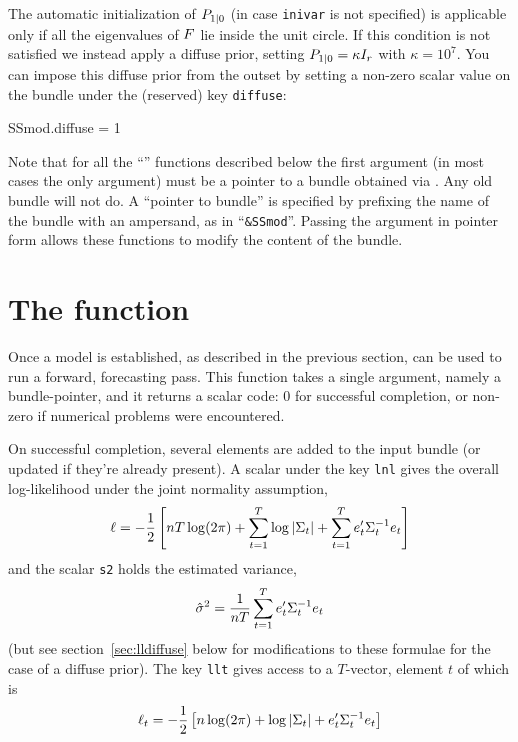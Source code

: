 \documentclass[a4paper]{article}
\begin{document}
The automatic initialization of $P_{1|0}$ (in case
\texttt{inivar} is not specified) is applicable only if all the
eigenvalues of $F$ lie inside the unit circle.  If this
condition is not satisfied we instead apply a diffuse prior, setting
$P_{1|0} = \kappa I_r$ with $\kappa = 10^7$.  You can
impose this diffuse prior from the outset by setting a non-zero scalar
value on the bundle under the (reserved) key \texttt{diffuse}:
%
\begin{code}
SSmod.diffuse = 1
\end{code}

Note that for all the ``'' functions described below the
first argument (in most cases the only argument) must be a pointer to
a bundle obtained via . Any old bundle will not do. A
``pointer to bundle'' is specified by prefixing the name of the bundle
with an ampersand, as in ``\verb|&SSmod|''. Passing the argument in
pointer form allows these functions to modify the content of the
bundle. 

\section{The  function}
\label{sec:kfilter}

Once a model is established, as described in the previous section,
 can be used to run a forward, forecasting pass.  This
function takes a single argument, namely a bundle-pointer, and it
returns a scalar code: 0 for successful completion, or non-zero if
numerical problems were encountered.

On successful completion, several elements are added to the input
bundle (or updated if they're already present).  A scalar under the
key \texttt{lnl} gives the overall log-likelihood under the joint
normality assumption,
%
\[
  \ell = -\frac{1}{2} \left[nT \log(2 \pi) + \sum_{t=1}^T\log \left|\Sigma_t\right| + 
    \sum_{t=1}^Te_t'\Sigma_t^{-1} e_t
  \right]
\]
%
and the scalar \texttt{s2} holds the estimated variance,
%
\[
\hat{\sigma}^2 = \frac{1}{nT} 
   \sum_{t=1}^Te_t'\Sigma_t^{-1} e_t
\]
(but see section~\ref{sec:lldiffuse} below for modifications to these
formulae for the case of a diffuse prior).  The key \texttt{llt} gives
access to a $T$-vector, element $t$ of which is
%
\[
  \ell_t = -\frac{1}{2} \left[n \log(2 \pi) + \log \left|\Sigma_t\right| + 
    e_t'\Sigma_t^{-1} e_t
  \right]
\]
%
\end{document}
